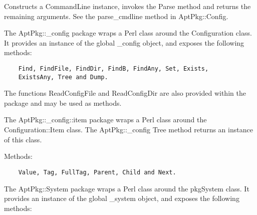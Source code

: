 \documentclass[]{article}
\renewcommand{\emph}[1]{\underline{#1}}
\begin{document}
\begin{description}
\itemsep1pt\parskip0pt
\item[\_parse\_cmdline(\emph{CONF}, \emph{ARG\_DEFS}, \ldots{})]
Constructs a CommandLine instance, invokes the Parse method and returns
the remaining arguments. See the parse\_cmdline method in
AptPkg::Config.
\end{description}


The AptPkg::\_config package wraps a Perl class around the Configuration
class. It provides an instance of the global \_config object, and
exposes the following methods:

\begin{verbatim}
    Find, FindFile, FindDir, FindB, FindAny, Set, Exists,
    ExistsAny, Tree and Dump.
\end{verbatim}

The functions ReadConfigFile and ReadConfigDir are also provided within
the package and may be used as methods.


The AptPkg::\_config::item package wraps a Perl class around the
Configuration::Item class. The AptPkg::\_config Tree method returns an
instance of this class.

Methods:

\begin{verbatim}
    Value, Tag, FullTag, Parent, Child and Next.
\end{verbatim}


The AptPkg::System package wraps a Perl class around the pkgSystem
class. It provides an instance of the global \_system object, and
exposes the following methods:
\end{document}
